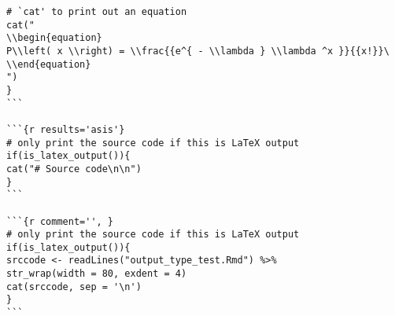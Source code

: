 \documentclass[
]{article}
\begin{document}
\begin{verbatim}
# `cat' to print out an equation
cat("
\\begin{equation}
P\\left( x \\right) = \\frac{{e^{ - \\lambda } \\lambda ^x }}{{x!}}\
\\end{equation}
")
}
```

```{r results='asis'}
# only print the source code if this is LaTeX output
if(is_latex_output()){
cat("# Source code\n\n")
}
```

```{r comment='', }
# only print the source code if this is LaTeX output
if(is_latex_output()){
srccode <- readLines("output_type_test.Rmd") %>%
str_wrap(width = 80, exdent = 4)
cat(srccode, sep = '\n')
}
```
\end{verbatim}
\end{document}
